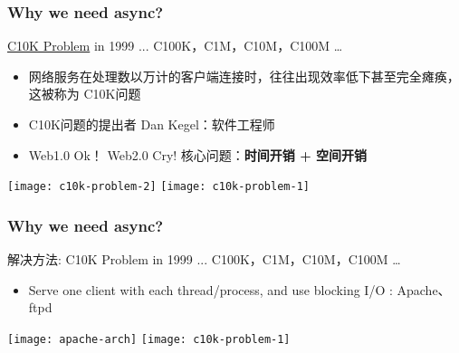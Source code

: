\begin{frame}[fragile]	
	\frametitle{Why we need async?}
	\href{http://www.kegel.com/c10k.html}{C10K Problem} in 1999 ... C100K，C1M，C10M，C100M …
	\begin{itemize}
		\item 网络服务在处理数以万计的客户端连接时，往往出现效率低下甚至完全瘫痪，这被称为 C10K问题
		\item C10K问题的提出者 Dan Kegel：软件工程师
		\item Web1.0 Ok！  Web2.0 Cry!   \pause 核心问题：\textbf{时间开销 + 空间开销}
	\end{itemize}	
	
	\centering
	
	\texttt{[image: c10k-problem-2]}
	\texttt{[image: c10k-problem-1]}
\end{frame}


\begin{frame}[fragile]	
	\frametitle{Why we need async?}
	
	解决方法: C10K Problem in 1999 ... C100K，C1M，C10M，C100M …
	\begin{itemize}
		\item Serve one client with each thread/process, and use blocking I/O : Apache、ftpd

		
	\end{itemize}	
	
	\centering
	
	\texttt{[image: apache-arch]}
	\texttt{[image: c10k-problem-1]}
\end{frame}

